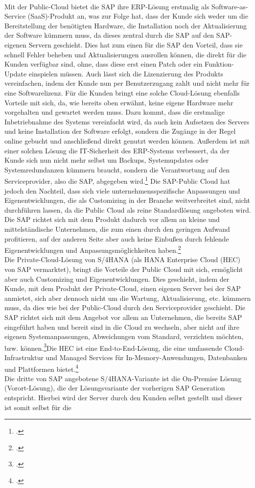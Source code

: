 \\Mit der Public-Cloud bietet die SAP ihre ERP-Lösung erstmalig als Software-as-Service (SaaS)-Produkt an, was zur Folge hat, dass der Kunde sich weder um die Bereitstellung der benötigten Hardware, die Installation noch der Aktualisierung der Software kümmern muss, da dieses zentral durch die SAP auf den SAP-eigenen Servern geschieht. Dies hat zum einen für die SAP den Vorteil, dass sie schnell Fehler beheben und Aktualisierungen ausrollen können, die direkt für die Kunden verfügbar sind, ohne, dass diese erst einen Patch oder ein Funktion-Update einspielen müssen. Auch lässt sich die Lizenzierung des Produkts vereinfachen, indem der Kunde nun per Benutzerzugang zahlt und nicht mehr für eine Softwarelizenz. Für die Kunden bringt eine solche Cloud-Lösung ebenfalls Vorteile mit sich, da, wie bereits oben erwähnt, keine eigene Hardware mehr vorgehalten und gewartet werden muss. Dazu kommt, dass die erstmalige Inbetriebnahme des Systems vereinfacht wird, da auch kein Aufsetzen des Servers und keine Installation der Software erfolgt, sondern die Zugänge in der Regel online gebucht und anschließend direkt genutzt werden können. Außerdem ist mit einer solchen Lösung die IT-Sicherheit des ERP-Systems verbessert, da der Kunde sich nun nicht mehr selbst um Backups, Systemupdates oder Systemredundanzen kümmern braucht, sondern die Verantwortung auf den Serviceprovider, also die SAP, abgegeben wird.\footcite[Vgl.][]{saas} Die SAP-Public Cloud hat jedoch den Nachteil, dass sich viele unternehmensspezifische Anpassungen und Eigenentwicklungen, die als \glqq{}Customizing\grqq{} in der Branche weitverbreitet sind, nicht durchführen lassen, da die Public Cloud als reine Standardlösung angeboten wird. Die SAP richtet sich mit dem Produkt dadurch vor allem an kleine und mittelständische Unternehmen, die zum einen durch den geringen Aufwand profitieren, auf der anderen Seite aber auch keine Einbußen durch fehlende Eigenentwicklungen und Anpassungsmöglichkeiten haben.\footcite[Vgl.][]{rz10-s4hana}\\Die Private-Cloud-Lösung von S/4HANA (als \glqq{}HANA Enterprise Cloud (HEC)\grqq{} von SAP vermarktet), bringt die Vorteile der Public Cloud mit sich, ermöglicht aber auch Customizing und Eigenentwicklungen. Dies geschieht, indem der Kunde, mit dem Produkt der Private-Cloud, einen eigenen Server bei der SAP anmietet, sich aber dennoch nicht um die Wartung, Aktualisierung, etc. kümmern muss, da dies wie bei der Public-Cloud durch den Serviceprovider geschieht. Die SAP richtet sich mit dem Angebot vor allem an Unternehmen, die bereits SAP eingeführt haben und bereit sind in die Cloud zu wechseln, aber nicht auf ihre eigenen Systemanpassungen, Abweichungen vom Standard, verzichten möchten, bzw. können.\footcite[Vgl.][]{rz10-hana}\glqq{}Die HEC ist eine End-to-End-Lösung, die eine umfassende Cloud-Infrastruktur und Managed Services für In-Memory-Anwendungen, Datenbanken und Plattformen bietet.\grqq{}\footcite[Vgl.][]{rz10-hana}\\Die dritte von SAP angebotene S/4HANA-Variante ist die On-Premise Lösung (Vorort-Lösung), die der Lösungsvariante der vorherigen SAP Generation entspricht. Hierbei wird der Server durch den Kunden selbst gestellt und dieser ist somit selbst für die 